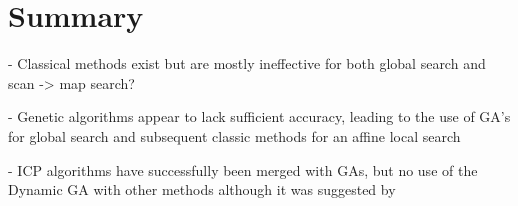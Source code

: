 \documentclass[authoryearcitations]{UoYCSproject}
\begin{document}
\section{Summary}
 - Classical methods exist but are mostly ineffective for both global search and scan -> map search?

 - Genetic algorithms appear to lack sufficient accuracy, leading to the use of GA's for global search and subsequent classic methods for an affine local search

 - ICP algorithms have successfully been merged with GAs, but no use of the Dynamic GA with other methods although it was suggested by \citet{Lomonosov2006-vq}
\cleardoublepage



\end{document}
